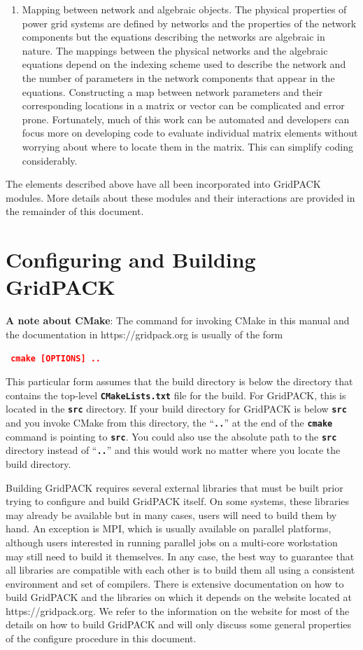 \documentclass[12pt]{report} %
\begin{document}
\begin{enumerate}
\item  Mapping between network and algebraic objects. The physical properties of power grid systems are defined by networks and the properties of the network components but the equations describing the networks are algebraic in nature. The mappings between the physical networks and the algebraic equations depend on the indexing scheme used to describe the network and the number of parameters in the network components that appear in the equations. Constructing a map between network parameters and their corresponding locations in a matrix or vector can be complicated and error prone. Fortunately, much of this work can be automated and developers can focus more on developing code to evaluate individual matrix elements without worrying about where to locate them in the matrix. This can simplify coding considerably.
\end{enumerate}

The elements described above have all been incorporated into GridPACK modules. More details about these modules and their interactions are provided in the remainder of this document.

\chapter{Configuring and Building GridPACK}

\textbf{A note about CMake}: The command for invoking CMake in this manual and the documentation in https://gridpack.org is usually of the form

\textcolor{red}{\texttt{\textbf{       cmake [OPTIONS] ..}}}

This particular form assumes that the build directory is below the directory that contains the top-level \texttt{\textbf{CMakeLists.txt}} file for the build. For GridPACK, this is located in the \texttt{\textbf{src}} directory. If your build directory for GridPACK is below \texttt{\textbf{src}} and you invoke CMake from this directory, the ``\texttt{\textbf{..}}'' at the end of the \texttt{\textbf{cmake}} command is pointing to \texttt{\textbf{src}}. You could also use the absolute path to the \texttt{\textbf{src}} directory instead of ``\texttt{\textbf{..}}'' and this would work no matter where you locate the build directory.

Building GridPACK requires several external libraries that must be built prior trying to configure and build GridPACK itself. On some systems, these libraries may already be available but in many cases, users will need to build them by hand. An exception is MPI, which is usually available on parallel platforms, although users interested in running parallel jobs on a multi-core workstation may still need to build it themselves. In any case, the best way to guarantee that all libraries are compatible with each other is to build them all using a consistent environment and set of compilers. There is extensive documentation on how to build GridPACK and the libraries on which it depends on the website located at https://gridpack.org. We refer to the information on the website for most of the details on how to build GridPACK and will only discuss some general properties of the configure procedure in this document.
\end{document}

